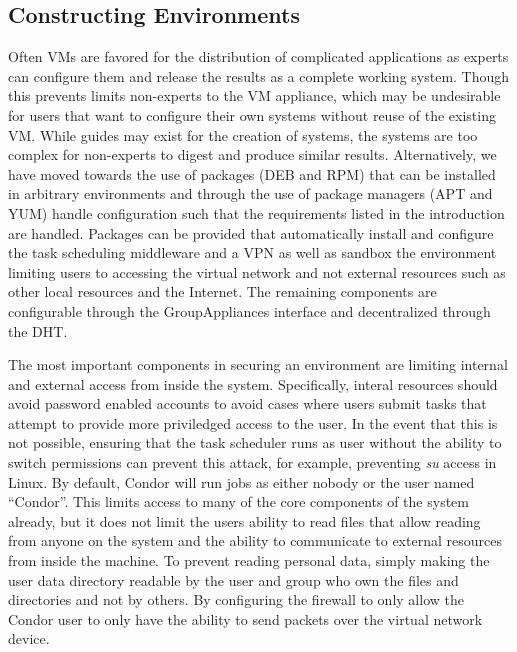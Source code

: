 \documentclass{sig-alternate}
\begin{document}
\subsection{Constructing Environments}
Often VMs are favored for the distribution of complicated applications as
experts can configure them and release the results as a complete working system.
Though this prevents limits non-experts to the VM appliance, which may be
undesirable for users that want to configure their own systems without reuse
of the existing VM.  While guides may exist for the creation of systems, the
systems are too complex for non-experts to digest and produce similar results.
Alternatively, we have moved towards the use of packages (DEB and RPM) that can
be installed in arbitrary environments and through the use of package managers
(APT and YUM) handle configuration such that the requirements listed in the
introduction are handled.  Packages can be provided that automatically
install and configure the task scheduling middleware and a VPN as well as
sandbox the environment limiting users to accessing the virtual network and not
external resources such as other local resources and the Internet.  The
remaining components are configurable through the GroupAppliances interface and
decentralized through the DHT.

The most important components in securing an environment are limiting internal
and external access from inside the system.  Specifically, interal resources
should avoid password enabled accounts to avoid cases where users submit tasks
that attempt to provide more priviledged access to the user.  In the event that
this is not possible, ensuring that the task scheduler runs as user without
the ability to switch permissions can prevent this attack, for example,
preventing \textit{su} access in Linux.  By default, Condor will run jobs as
either nobody or the user named ``Condor''.  This limits access to many of the
core components of the system already, but it does not limit the users ability
to read files that allow reading from anyone on the system and the ability to
communicate to external resources from inside the machine.  To prevent reading
personal data, simply making the user data directory readable by the user and
group who own the files and directories and not by others.  By configuring the
firewall to only allow the Condor user to only have the ability to send packets
over the virtual network device.
\end{document}
